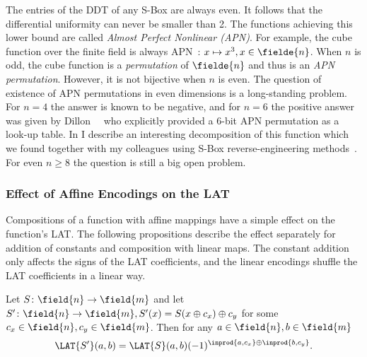 The entries of the DDT of any S-Box are always even. It follows that the differential uniformity can never be smaller than 2. The functions achieving this lower bound are called \emph{Almost Perfect Nonlinear (APN)}. For example, the cube function over the finite field is always APN~\cite{Nyb94}: $x \mapsto x^3, x \in \fielde{n}$. When $n$ is odd, the cube function is a \emph{permutation} of $\fielde{n}$ and thus is an \emph{APN permutation}. However, it is not bijective when $n$ is even. The question of existence of APN permutations in even dimensions is a long-standing problem. For $n=4$ the answer is known to be negative, and for $n=6$ the positive answer was given by Dillon~\etal{}~\cite{DillonAPN} who explicitly provided a 6-bit APN permutation as a look-up table. In  I describe an interesting decomposition of this function which we found together with my colleagues using S-Box reverse-engineering methods~\cite{OurAPN}. For even $n\ge 8$ the question is still a big open problem.


\subsubsection{Effect of Affine Encodings on the LAT}

Compositions of a function with affine mappings have a simple effect on the function's LAT. The following propositions describe the effect separately for addition of constants and composition with linear maps. The constant addition only affects the signs of the LAT coefficients, and the linear encodings shuffle the LAT coefficients in a linear way.

\begin{proposition}
Let $S\colon \field{n} \to \field{m}$ and let $S'\colon \field{n} \to \field{m}, S'(x) = S(x \oplus c_x) \oplus c_y$ for some $c_x \in \field{n}, c_y \in \field{m}$. Then for any $a \in \field{n}, b \in \field{m}$
$$
\LAT{S'}(a,b) = \LAT{S}(a,b) (-1)^{\inprod{a,c_x}\oplus {\inprod{b, c_y}}}.
$$
\end{proposition}

